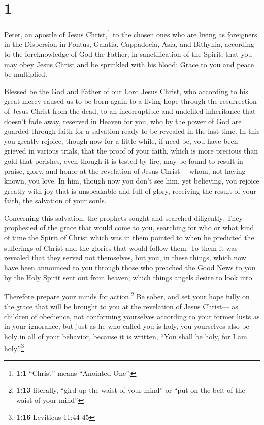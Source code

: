 \hypertarget{section}{%
\section{1}\label{section}}

 Peter, an apostle of Jesus Christ,\footnote{\textbf{1:1}
  ``Christ'' means ``Anointed One''.} to the chosen ones who are living
as foreigners in the Dispersion in Pontus, Galatia, Cappadocia, Asia,
and Bithynia,  according to the foreknowledge of God the
Father, in sanctification of the Spirit, that you may obey Jesus Christ
and be sprinkled with his blood: Grace to you and peace be multiplied.

 Blessed be the God and Father of our Lord Jesus Christ,
who according to his great mercy caused us to be born again to a living
hope through the resurrection of Jesus Christ from the dead,
 to an incorruptible and undefiled inheritance that
doesn't fade away, reserved in Heaven for you,  who by the
power of God are guarded through faith for a salvation ready to be
revealed in the last time.  In this you greatly rejoice,
though now for a little while, if need be, you have been grieved in
various trials,  that the proof of your faith, which is
more precious than gold that perishes, even though it is tested by fire,
may be found to result in praise, glory, and honor at the revelation of
Jesus Christ---  whom, not having known, you love. In him,
though now you don't see him, yet believing, you rejoice greatly with
joy that is unspeakable and full of glory,  receiving the
result of your faith, the salvation of your souls.

 Concerning this salvation, the prophets sought and
searched diligently. They prophesied of the grace that would come to
you,  searching for who or what kind of time the Spirit
of Christ which was in them pointed to when he predicted the sufferings
of Christ and the glories that would follow them.  To
them it was revealed that they served not themselves, but you, in these
things, which now have been announced to you through those who preached
the Good News to you by the Holy Spirit sent out from heaven; which
things angels desire to look into.

 Therefore prepare your minds for action.\footnote{\textbf{1:13}
  literally, ``gird up the waist of your mind'' or ``put on the belt of
  the waist of your mind''} Be sober, and set your hope fully on the
grace that will be brought to you at the revelation of Jesus Christ---
 as children of obedience, not conforming yourselves
according to your former lusts as in your ignorance,  but
just as he who called you is holy, you yourselves also be holy in all of
your behavior,  because it is written, ``You shall be
holy, for I am holy.''\footnote{\textbf{1:16} Leviticus 11:44-45}

